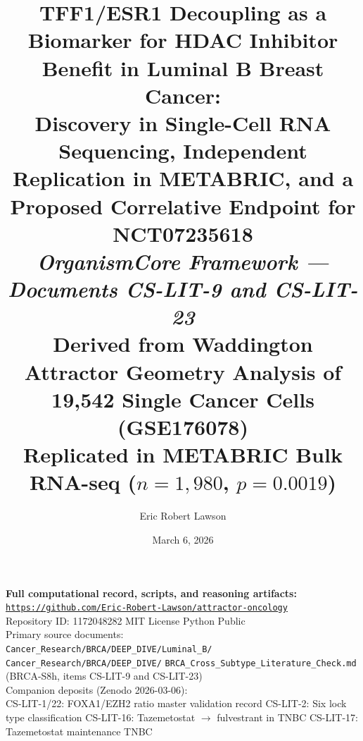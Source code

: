 \documentclass[12pt, a4paper]{article}
\title{
    \vspace{-1em}
    \textbf{TFF1/ESR1 Decoupling as a Biomarker for
    HDAC Inhibitor Benefit in Luminal B Breast Cancer:}\\[0.5em]
    \large Discovery in Single-Cell RNA Sequencing,
    Independent Replication in METABRIC, and a
    Proposed Correlative Endpoint for NCT07235618\\[0.4em]
    \normalsize \textit{OrganismCore Framework ---
    Documents CS-LIT-9 and CS-LIT-23}\\[0.3em]
    \small Derived from Waddington Attractor Geometry
    Analysis of 19,542 Single Cancer Cells (GSE176078)\\[0.3em]
    \small Replicated in METABRIC Bulk RNA-seq
    ($n=1{,}980$, $p=0.0019$)
}
\author[1]{Eric Robert Lawson}
\affil[1]{
    OrganismCore\\
    \href{mailto:OrganismCore@proton.me}
         {OrganismCore@proton.me}\\
    ORCID:
    \href{https://orcid.org/0009-0002-0414-6544}
         {0009-0002-0414-6544}
}
\date{March 6, 2026}
\begin{document}

\maketitle
\thispagestyle{fancy}

\begin{center}
\colorbox{repobox}{
\begin{minipage}{0.88\textwidth}
\vspace{0.4em}
\centering
\textbf{Full computational record, scripts, and
reasoning artifacts:}\\[0.3em]
\href{https://github.com/Eric-Robert-Lawson/attractor-oncology}
{\texttt{https://github.com/Eric-Robert-Lawson/attractor-oncology}}
\\[0.2em]
\small
Repository ID: 1172048282 \textbar{}
MIT License \textbar{}
Python \textbar{}
Public\\[0.2em]
Primary source documents:\\
\texttt{Cancer\_Research/BRCA/DEEP\_DIVE/Luminal\_B/}\\
\texttt{Cancer\_Research/BRCA/DEEP\_DIVE/}
\texttt{BRCA\_Cross\_Subtype\_Literature\_Check.md}
(BRCA-S8h, items CS-LIT-9 and CS-LIT-23)\\[0.2em]
Companion deposits (Zenodo 2026-03-06):\\
CS-LIT-1/22: FOXA1/EZH2 ratio master validation
record \textbar{}
CS-LIT-2: Six lock type classification \textbar{}
CS-LIT-16: Tazemetostat $\rightarrow$ fulvestrant
in TNBC \textbar{}
CS-LIT-17: Tazemetostat maintenance TNBC
\vspace{0.4em}
\end{minipage}
}
\end{center}

\vspace{0.8em}
\end{document}
